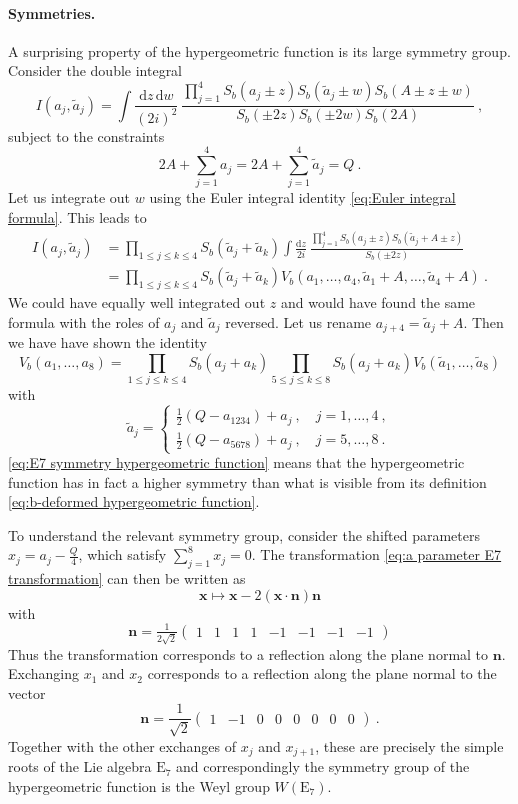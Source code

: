 \documentclass[12pt,a4paper]{article}
\newcommand{\be}{\begin{equation}}
\newcommand{\ee}{\end{equation}}
\renewcommand\d{\text{d}}
\begin{document}
\paragraph{Symmetries.} A surprising property of the hypergeometric function is its large symmetry group. Consider the double integral
\be 
I(a_j,\tilde{a}_j)=\int \frac{\d z \, \d w}{(2i)^2}\ \frac{\prod_{j=1}^4 S_b(a_j \pm z) S_b(\tilde{a}_j \pm w) S_b(A \pm z \pm w)}{S_b(\pm 2 z) S_b(\pm 2w)S_b(2A)}\ ,
\ee
subject to the constraints
\be 
2A+\sum_{j=1}^4 a_j=2A+\sum_{j=1}^4 \tilde{a}_j=Q\ .
\ee
Let us integrate out $w$ using the Euler integral identity \eqref{eq:Euler integral formula}. This leads to
\begin{align} 
I(a_j,\tilde{a}_j)&=\prod_{1 \le j \le k \le 4} S_b(\tilde{a}_j+\tilde{a}_k) \int \frac{\d z}{2i}\ \frac{\prod_{j=1}^4 S_b(a_j \pm z) S_b(\tilde{a}_j+A \pm z)}{S_b(\pm 2z)} \\
&=\prod_{1 \le j \le k \le 4} S_b(\tilde{a}_j+\tilde{a}_k) V_b(a_1,\dots,a_4,\tilde{a}_1+A,\dots,\tilde{a}_4+A)\ .
\end{align}
We could have equally well integrated out $z$ and would have found the same formula with the roles of $a_j$ and $\tilde{a}_j$ reversed.
Let us rename $a_{j+4}=\tilde{a}_j+A$. Then we have have shown the identity
\be 
 V_b(a_1,\dots,a_8)=\prod_{1 \le j \le k \le 4} S_b(a_j+a_k)\prod_{5 \le j \le k \le 8} S_b(a_j+a_k) V_b(\tilde{a}_1,\dots,\tilde{a}_8) \label{eq:E7 symmetry hypergeometric function}
\ee
with
\be 
\tilde{a}_j=\begin{cases}
    \frac{1}{2}(Q-a_{1234})+a_j\ , \quad j=1,\dots,4\ , \\
    \frac{1}{2}(Q-a_{5678})+a_j\ , \quad j=5,\dots,8\ .    
\end{cases} \label{eq:a parameter E7 transformation}
\ee
\eqref{eq:E7 symmetry hypergeometric function} means that the hypergeometric function has in fact a higher symmetry than what is visible from its definition \eqref{eq:b-deformed hypergeometric function}. 

To understand the relevant symmetry group, consider the shifted parameters $x_j=a_j-\frac{Q}{4}$, which satisfy $\sum_{j=1}^8 x_j=0$. The transformation \eqref{eq:a parameter E7 transformation} can then be written as
\be 
\boldsymbol{x} \longmapsto\boldsymbol{x}-2 (\boldsymbol{x} \cdot \boldsymbol{n}) \boldsymbol{n}
\ee
with
\be 
 \boldsymbol{n}=\tfrac{1}{2 \sqrt{2}}\begin{pmatrix}
    1 & 1 & 1 & 1 & -1 & -1 & -1 & -1
\end{pmatrix} \label{eq:exceptional vector E7}
\ee
Thus the transformation corresponds to a reflection along the plane normal to $\boldsymbol{n}$.
Exchanging $x_1$ and $x_2$ corresponds to a reflection along the plane normal to the vector
\be 
\boldsymbol{n}=\frac{1}{\sqrt{2}} \begin{pmatrix}
    1 & -1 & 0 & 0 & 0 & 0 & 0 & 0
\end{pmatrix}\ .
\ee
Together with the other exchanges of $x_j$ and $x_{j+1}$, these are precisely the simple roots of the Lie algebra $\text{E}_7$ and correspondingly the symmetry group of the hypergeometric function is the Weyl group $W(\text{E}_7)$.
\end{document}
